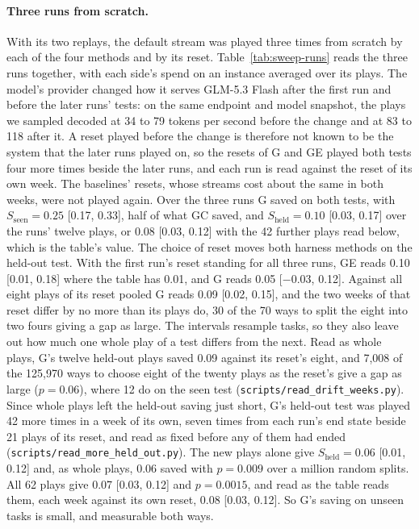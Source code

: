 \paragraph{Three runs from scratch.}\label{app:runs}
With its two replays, the default stream was played three times from scratch by each of the four methods and by its reset. Table~\ref{tab:sweep-runs} reads the three runs together, with each side's spend on an instance averaged over its plays. The model's provider changed how it serves GLM-5.3 Flash after the first run and before the later runs' tests: on the same endpoint and model snapshot, the plays we sampled decoded at 34 to 79 tokens per second before the change and at 83 to 118 after it. A reset played before the change is therefore not known to be the system that the later runs played on, so the resets of G and GE played both tests four more times beside the later runs, and each run is read against the reset of its own week. The baselines' resets, whose streams cost about the same in both weeks, were not played again. Over the three runs G saved on both tests, with $S_{\mathrm{seen}} = 0.25$ [0.17, 0.33], half of what GC saved, and $S_{\mathrm{held}} = 0.10$ [0.03, 0.17] over the runs' twelve plays, or 0.08 [0.03, 0.12] with the 42 further plays read below, which is the table's value. The choice of reset moves both harness methods on the held-out test. With the first run's reset standing for all three runs, GE reads 0.10 [0.01, 0.18] where the table has 0.01, and G reads 0.05 [$-0.03$, 0.12]. Against all eight plays of its reset pooled G reads 0.09 [0.02, 0.15], and the two weeks of that reset differ by no more than its plays do, 30 of the 70 ways to split the eight into two fours giving a gap as large. The intervals resample tasks, so they also leave out how much one whole play of a test differs from the next. Read as whole plays, G's twelve held-out plays saved 0.09 against its reset's eight, and 7,008 of the 125,970 ways to choose eight of the twenty plays as the reset's give a gap as large ($p = 0.06$), where 12 do on the seen test (\texttt{scripts/read\_drift\_weeks.py}). Since whole plays left the held-out saving just short, G's held-out test was played 42 more times in a week of its own, seven times from each run's end state beside 21 plays of its reset, and read as fixed before any of them had ended (\texttt{scripts/read\_more\_held\_out.py}). The new plays alone give $S_{\mathrm{held}} = 0.06$ [0.01, 0.12] and, as whole plays, 0.06 saved with $p = 0.009$ over a million random splits. All 62 plays give 0.07 [0.03, 0.12] and $p = 0.0015$, and read as the table reads them, each week against its own reset, 0.08 [0.03, 0.12]. So G's saving on unseen tasks is small, and measurable both ways.

